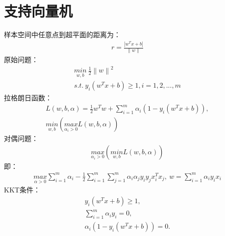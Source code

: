 \documentclass[letterpaper,10pt,english]{sphinxmanual}
\begin{document}
\section{支持向量机}
\label{\detokenize{machineLearning/02_svm::doc}}\label{\detokenize{machineLearning/02_svm:id1}}
样本空间中任意点到超平面的距离为：
\begin{equation*}
\begin{split}r = \frac{|w^T x + b|}{\| w \|}\end{split}
\end{equation*}
原始问题：
\begin{equation*}
\begin{split}\underset{w,b}{min} \  \frac{1}{2} \left \| w \right \|^2 \\
s.t. \  y_i(w^T x + b) \geqslant 1, i=1,2,...,m\end{split}
\end{equation*}
拉格朗日函数：
\begin{equation*}
\begin{split}L(w,b,\alpha) = \frac{1}{2}w^Tw + \sum_{i=1}^m \alpha_i(1 - y_i(w^T x + b)),\\
\underset{w,b}{min}(\underset{\alpha_i>0}{max}L(w,b,\alpha))\end{split}
\end{equation*}
对偶问题：
\begin{equation*}
\begin{split}\underset{\alpha_i>0}{max}(\underset{w,b}{min}L(w,b,\alpha))\end{split}
\end{equation*}
即：
\begin{equation*}
\begin{split}\underset{\alpha>0}{max} \sum_{i=1}^m\alpha_i - \frac{1}{2} \sum_{i=1}^m \sum_{j=1}^m \alpha_i \alpha_j y_i y_j x_i^T x_j,\  w=\sum_{i=1}^m\alpha_i y_i x_i\end{split}
\end{equation*}
KKT条件：
\begin{equation*}
\begin{split}y_i(w^T x + b) \geqslant 1, \\
\sum_{i=1}^m \alpha_i y_i = 0,\\
\alpha_i (1 - y_i(w^T x + b)) = 0.\end{split}
\end{equation*}
\end{document}

